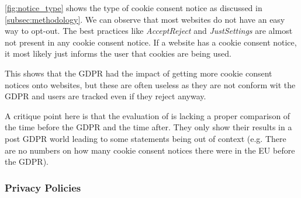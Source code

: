 \autoref{fig:notice_type} shows the type of cookie consent notice as discussed in \autoref{subsec:methodology}.
We can observe that most websites do not have an easy way to opt-out. The best practices like \emph{AcceptReject} and
\emph{JustSettings} are almost not present in any cookie consent notice. If a website has a cookie consent notice, it
most likely just informs the user that cookies are being used.

This shows that the GDPR had the impact of getting more
cookie consent notices onto websites, but these are often useless as they are not conform wit the GDPR and users are
tracked even if they reject anyway.

A critique point here is that the evaluation of  is lacking a proper comparison of the time before
the GDPR and the time after. They only show their results in a post GDPR world leading to some statements being out of
context (e.g. There are no numbers on how many cookie consent notices there were in the EU before the GDPR).

\subsubsection{Privacy Policies}


